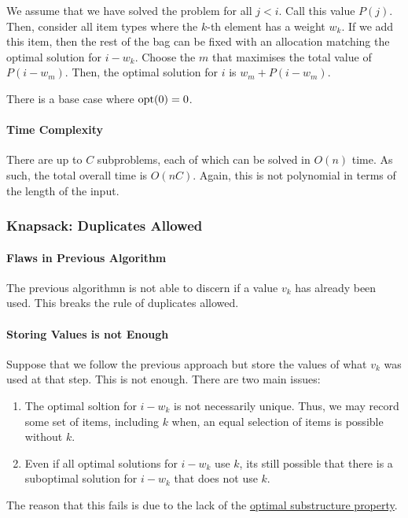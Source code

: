 We assume that we have solved the problem for all \(j < i\). Call this value \(P(j)\).
Then, consider all item types where the \(k\)-th element has a weight
\(w_k\). If we add this item, then the rest of the bag can be
fixed with  an allocation matching the optimal solution for \(i - w_k\).
Choose the \(m\) that maximises the total value of \(P(i - w_m)\).
Then, the optimal solution for \(i\) is \(w_m + P(i - w_m)\).

There is a base case where \(\mathrm{opt}(0) = 0\).

\paragraph{Time Complexity}
There are up to \(C\) subproblems, each of which can be solved in \(O(n)\) time.
As such, the total overall time is  \(O(nC)\). Again, this is not polynomial in terms
of the length of the input.

\subsubsection{Knapsack: Duplicates Allowed}

\paragraph{Flaws in Previous Algorithm}
The previous algorithmn is not able to discern if a value \(v_k\) has already been used.
This breaks the rule of duplicates allowed.

\paragraph{Storing Values is not Enough}
Suppose that we follow the previous approach but store the values of what \(v_k\)
was used at that step. This is not enough. There are two main issues:
\begin{enumerate}
  \item The optimal soltion for \(i - w_k\) is not necessarily unique.
    Thus, we may record some set of items, including  \(k\) when, an equal selection of
    items is possible without \(k\). 
  \item Even if all optimal solutions for \(i - w_k\) use  \(k\), its still possible that
    there is a suboptimal solution for \(i - w_k\) that does not use \(k\).
\end{enumerate}
The reason that this fails is due to the lack of the \underline{optimal substructure property}.

